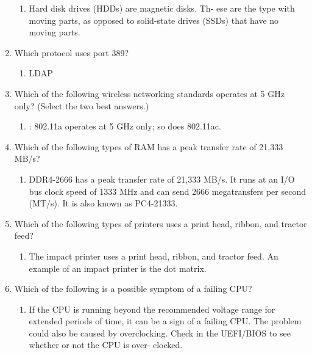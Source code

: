 \documentclass{article}
\begin{document}
\begin{enumerate}
    \begin{enumerate}
        \item Hard	disk	drives	(HDDs)	are	magnetic	disks.	Th‐
ese	are	the	type	with	moving	parts,	as	opposed	to	solid-state
drives	(SSDs)	that	have	no	moving	parts.

    \end{enumerate}
    \item Which	protocol	uses	port	389?

    \begin{enumerate}
        \item LDAP 
    \end{enumerate}
    \item Which	of	the	following	wireless	networking	standards	operates
at	5	GHz	only?	(Select	the	two	best	answers.)

    \begin{enumerate}
        \item :	802.11a	operates	at	5	GHz	only;	so	does	802.11ac.

    \end{enumerate}
    \item Which	of	the	following	types	of	RAM	has	a	peak	transfer	rate	of
21,333	MB/s?

    \begin{enumerate}
        \item DDR4-2666	has	a	peak	transfer	rate	of	21,333
MB/s.	It	runs	at	an	I/O	bus	clock	speed	of	1333	MHz	and	can
send	2666	megatransfers	per	second	(MT/s).	It	is	also	known	as
PC4-21333.

    \end{enumerate}
    \item Which	of	the	following	types	of	printers	uses	a	print	head,	ribbon,
and	tractor	feed?

    \begin{enumerate}
        \item The	impact	printer	uses	a	print	head,	ribbon,	and
tractor	feed.	An	example	of	an	impact	printer	is	the	dot	matrix.

    \end{enumerate}
    \item Which	of	the	following	is	a	possible	symptom	of	a	failing	CPU?

    \begin{enumerate}
        \item If	the	CPU	is	running	beyond	the	recommended
voltage	range	for	extended	periods	of	time,	it	can	be	a	sign	of	a
failing	CPU.	The	problem	could	also	be	caused	by	overclocking.
Check	in	the	UEFI/BIOS	to	see	whether	or	not	the	CPU	is	over‐
clocked.


\end{enumerate}
\end{enumerate}
\end{document}
